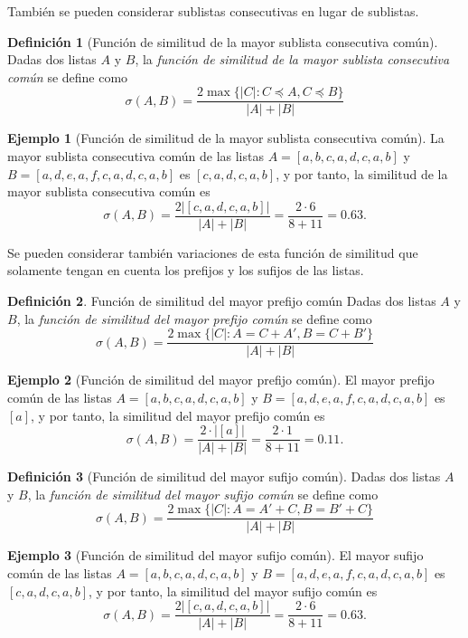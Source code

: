 \documentclass[a4paper,10pt,twoside]{article}
\theoremstyle{definition}
\newtheorem{definition}{Definición}
\newtheorem{example}{Ejemplo}
\begin{document}
También se pueden considerar sublistas consecutivas en lugar de sublistas. 

\begin{definition}[Función de similitud de la mayor sublista consecutiva común]
Dadas dos listas $A$ y $B$, la \emph{función de similitud de la mayor sublista consecutiva común} se define como
\[
\sigma(A,B) = \frac{2\max\{|C|:C\preceq A, C\preceq B\}}{|A|+|B|}
\]
\end{definition}

\begin{example}[Función de similitud de la mayor sublista consecutiva común]
La mayor sublista consecutiva común de las listas $A=[a,b,c,a,d,c,a,b]$ y $B=[a,d,e,a,f,c,a,d,c,a,b]$ es $[c,a,d,c,a,b]$, y por tanto, la similitud de la mayor sublista consecutiva común es 
\[
\sigma(A,B) = \frac{2|[c,a,d,c,a,b]|}{|A|+|B|} = \frac{2\cdot 6}{8+11} =
0.63.
\]
\end{example}

Se pueden considerar también variaciones de esta función de similitud que solamente tengan en cuenta los prefijos y los sufijos de las listas.

\begin{definition}{Función de similitud del mayor prefijo común}
Dadas dos listas $A$ y $B$, la \emph{función de similitud del mayor prefijo común} se define como
\[
\sigma(A,B)=\frac{2\max\{|C|: A=C+A', B=C+B'\}}{|A|+|B|}
\]
\end{definition}

\begin{example}[Función de similitud del mayor prefijo común]
El mayor prefijo común de las listas $A=[a,b,c,a,d,c,a,b]$ y $B=[a,d,e,a,f,c,a,d,c,a,b]$ es $[a]$, y por tanto, la similitud del mayor prefijo común es
\[
\sigma(A,B)=\frac{2\cdot |[a]|}{|A|+|B|} = \frac{2\cdot 1}{8+11} = 0.11.
\]
\end{example}

\begin{definition}[Función de similitud del mayor sufijo común]
Dadas dos listas $A$ y $B$, la \emph{función de similitud del mayor sufijo común} se define como
\[
\sigma(A,B)=\frac{2\max\{|C|: A=A'+C, B=B'+C\}}{|A|+|B|}
\]
\end{definition}

\begin{example}[Función de similitud del mayor sufijo común]
El mayor sufijo común de las listas $A=[a,b,c,a,d,c,a,b]$ y $B=[a,d,e,a,f,c,a,d,c,a,b]$ es $[c,a,d,c,a,b]$, y por tanto, la similitud del mayor sufijo común es
\[
\sigma(A,B) = \frac{2|[c,a,d,c,a,b]|}{|A|+|B|} = \frac{2\cdot 6}{8+11} =
0.63.
\]
\end{example}
\end{document}

